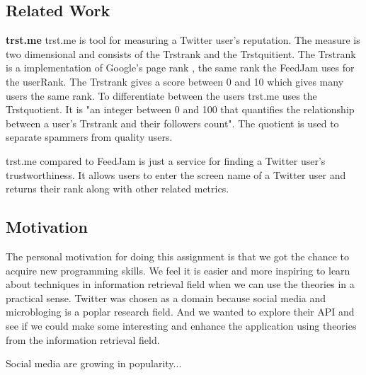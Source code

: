 \subsection{Related Work}
{\bf trst.me} \newline
trst.me \citet{Infochimps2012b} is tool for measuring a Twitter user's reputation. The measure is two dimensional and consists of the Trstrank and the Trstquitient. The Trstrank is a implementation of Google's page rank \citep{Infochimps2012a}, the same rank the FeedJam uses for the userRank. The Trstrank gives a score between 0 and 10 which gives many users the same rank. To differentiate between the users trst.me uses the Trstquotient. It is "an integer between 0 and 100 that quantifies the relationship between a user's Trstrank and their followers count"\citep{Infochimps2012}. The quotient is used to separate spammers from quality users. 

trst.me compared to FeedJam is just a service for finding a Twitter user's trustworthiness. It allows users to enter the screen name of a Twitter user and returns their rank along with other related metrics.  

\subsection{Motivation} %
The personal motivation for doing this assignment is that we got the chance to acquire new programming skills. We feel it is easier and more inspiring to learn about techniques in information retrieval field when we can use the theories in a practical sense. Twitter was chosen as a domain because social media and microbloging is a poplar research field. And we wanted to explore their API and see if we could make some interesting and enhance the application using theories from the information retrieval field. 

Social media are growing in popularity...

